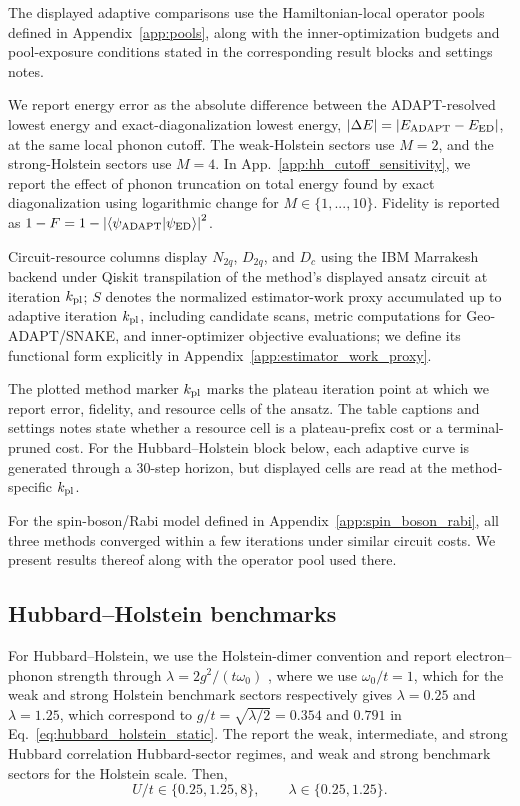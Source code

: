 \documentclass[
  reprint,
  amsmath,
  amssymb,
  aps,
  pra,
  nofootinbib,
  superscriptaddress,
  floatfix
]{revtex4-2}
\newcommand{\braket}[2]{\langle #1|#2\rangle}
\begin{document}
The displayed adaptive comparisons use the Hamiltonian-local operator pools defined in Appendix~\ref{app:pools}, along with the inner-optimization budgets and pool-exposure conditions stated in the corresponding result blocks and settings notes.

We report energy error as the absolute difference between the ADAPT-resolved lowest energy and exact-diagonalization lowest energy, \(|\Delta E|=|E_{\rm ADAPT}-E_{\rm ED}|\), at the same local phonon cutoff. The weak-Holstein sectors use \(M=2\), and the strong-Holstein sectors use \(M=4\).
In App.~\ref{app:hh_cutoff_sensitivity}, we report the effect of phonon truncation on total energy found by exact diagonalization using logarithmic change for $M\in\{1,...,10\}.$ Fidelity is reported as \(1-F=1-\left|\braket{\psi_{\rm ADAPT}}{\psi_{\rm ED}}\right|^2\).

Circuit-resource columns display \(N_{2q}\), \(D_{2q}\), and \(D_c\) using the IBM Marrakesh backend under Qiskit transpilation of the method's displayed ansatz circuit at iteration $k_{\rm{pl}}$; \(S\) denotes the normalized estimator-work proxy accumulated up to adaptive iteration $k_{\rm{pl}}$, including candidate scans, metric computations for Geo-ADAPT/SNAKE, and inner-optimizer objective evaluations; we define its functional form explicitly in Appendix~\ref{app:estimator_work_proxy}.


The plotted method marker \(k_{\rm pl}\) marks the plateau iteration point at which we report error, fidelity, and resource cells of the ansatz. The table captions and settings notes state whether a resource cell is a plateau-prefix cost or a terminal-pruned cost. For the Hubbard--Holstein block below, each adaptive curve is generated through a 30-step horizon, but displayed cells are read at the method-specific \(k_{\rm pl}\).

For the spin-boson/Rabi model defined in Appendix~\ref{app:spin_boson_rabi}, all three methods converged within a few iterations under similar circuit costs. We present results thereof along with the operator pool used there.

\subsection{Hubbard--Holstein benchmarks}

For Hubbard--Holstein, we use the Holstein-dimer convention and report electron--phonon strength through \(\lambda=2g^2/(t\omega_0)\) \cite{Sakkinen2015HolsteinDimer}, where  we use
\(\omega_0/t=1\), which for the weak and strong Holstein benchmark sectors respectively gives
\(\lambda=0.25\) and \(\lambda=1.25\), which correspond to
\(g/t=\sqrt{\lambda/2}=0.354\) and \(0.791\) in Eq.~\eqref{eq:hubbard_holstein_static}. 
The report the weak, intermediate, and strong Hubbard correlation Hubbard-sector regimes, and weak and strong benchmark sectors for the Holstein scale. Then,
\[
U/t\in\{0.25,1.25,8\},\qquad \lambda\in\{0.25,1.25\}.
\]
\end{document}
